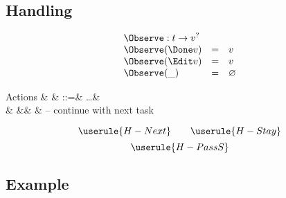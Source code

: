 \subsection{Handling}

\begin{equation*}
  \begin{array}{lcl}
    \multicolumn{3}{l}{\Observe : t \to v^?} \\
    \Observe(\Done v) &=& v \\
    \Observe(\Edit v) &=& v \\
    \Observe(\_)      &=& \nothing
  \end{array}
\end{equation*}

\begin{grammar}
  Actions
    & \alpha & ::=& \ldots & \\
    &        &\mid& \Continue  & – continue with next task \\
\end{grammar}

\begin{equation*}
  \userule{H-Next} \qquad \userule{H-Stay}
\end{equation*}
\begin{equation*}
  \userule{H-PassS}
\end{equation*}

\subsection{Example}
